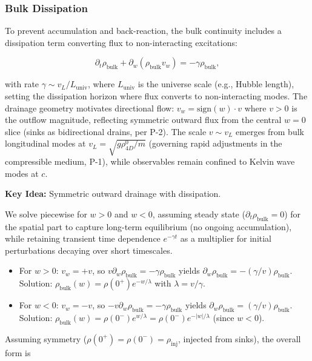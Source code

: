 \subsubsection{Bulk Dissipation}
To prevent accumulation and back-reaction, the bulk continuity includes a dissipation term converting flux to non-interacting excitations:

\begin{equation}
\partial_t \rho_{\text{bulk}} + \partial_w (\rho_{\text{bulk}} v_w) = -\gamma \rho_{\text{bulk}},
\end{equation}

with rate $\gamma \sim v_L / L_{\text{univ}}$, where $L_{\text{univ}}$ is the universe scale (e.g., Hubble length), setting the dissipation horizon where flux converts to non-interacting modes. The drainage geometry motivates directional flow: $v_w = \text{sign}(w) \cdot v$ where $v > 0$ is the outflow magnitude, reflecting symmetric outward flux from the central $w=0$ slice (sinks as bidirectional drains, per P-2). The scale $v \sim v_L$ emerges from bulk longitudinal modes at $v_L = \sqrt{g \rho_{4D}^0 / m}$ (governing rapid adjustments in the compressible medium, P-1), while observables remain confined to Kelvin wave modes at $c$.

\textbf{Key Idea:} Symmetric outward drainage with dissipation.

We solve piecewise for $w > 0$ and $w < 0$, assuming steady state ($\partial_t \rho_{\text{bulk}} = 0$) for the spatial part to capture long-term equilibrium (no ongoing accumulation), while retaining transient time dependence $e^{-\gamma t}$ as a multiplier for initial perturbations decaying over short timescales.

\begin{itemize}
\item For $w > 0$: $v_w = +v$, so $v \partial_w \rho_{\text{bulk}} = -\gamma \rho_{\text{bulk}}$ yields $\partial_w \rho_{\text{bulk}} = -(\gamma / v) \rho_{\text{bulk}}$. Solution: $\rho_{\text{bulk}}(w) = \rho(0^+) e^{-w / \lambda}$ with $\lambda = v / \gamma$.
\item For $w < 0$: $v_w = -v$, so $-v \partial_w \rho_{\text{bulk}} = -\gamma \rho_{\text{bulk}}$ yields $\partial_w \rho_{\text{bulk}} = (\gamma / v) \rho_{\text{bulk}}$. Solution: $\rho_{\text{bulk}}(w) = \rho(0^-) e^{w / \lambda} = \rho(0^-) e^{-|w| / \lambda}$ (since $w < 0$).
\end{itemize}

Assuming symmetry ($\rho(0^+) = \rho(0^-) = \rho_{\text{inj}}$, injected from sinks), the overall form is

